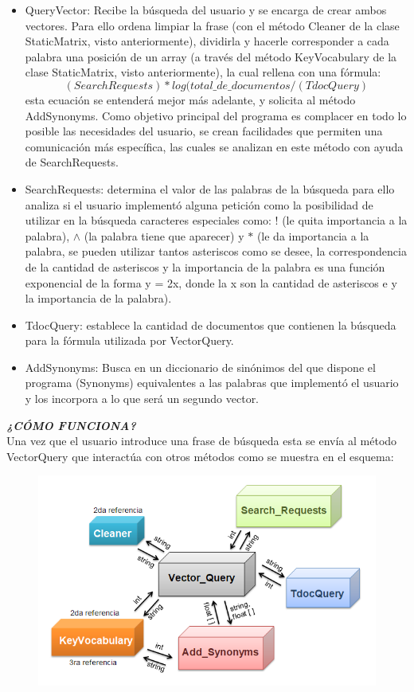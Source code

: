 \documentclass[12pt, letterpaper]{article}
\begin{document}
\begin{itemize}
    \item  QueryVector: Recibe la búsqueda del usuario y se encarga de crear ambos vectores. Para ello ordena limpiar la frase (con el método Cleaner de la clase StaticMatrix, visto anteriormente),  dividirla y hacerle corresponder a cada palabra una posición de un array (a través del método KeyVocabulary de la clase StaticMatrix, visto anteriormente), la cual rellena con una fórmula: \[(SearchRequests) * log(total\_de\_documentos / (TdocQuery)\] esta ecuación se entenderá mejor más adelante,  y solicita al método AddSynonyms. Como objetivo principal del programa es complacer en todo lo posible las necesidades del usuario, se crean facilidades que permiten una comunicación más específica, las cuales se analizan en este método con ayuda de SearchRequests. 
    \item SearchRequests: determina el valor de las palabras de la búsqueda  para ello analiza si el usuario implementó alguna petición como la posibilidad de utilizar en la búsqueda caracteres especiales como: ! (le quita importancia a la palabra),  $\land$ (la palabra tiene que aparecer) y  \(*\) (le da importancia a la palabra, se pueden utilizar tantos asteriscos como se desee, la correspondencia de la cantidad de asteriscos y la importancia de la palabra es una función exponencial de la forma y = 2x, donde la x son la cantidad de asteriscos  e y la importancia de la palabra). 
    \item TdocQuery: establece la cantidad de documentos que contienen la búsqueda para la fórmula utilizada por VectorQuery. 
    \item AddSynonyms: Busca en un diccionario de sinónimos del que dispone el programa (Synonyms) equivalentes a las palabras que implementó el usuario y los incorpora a lo que será un segundo vector. 
\end{itemize}
 
\textbf{\textit{¿CÓMO FUNCIONA? }} \\
Una vez que el usuario introduce una frase de búsqueda esta se envía al método VectorQuery que interactúa con otros métodos como se muestra en el esquema: 

\begin{figure}[h]
    \includegraphics[scale= 0.6]{dos.png}
\end{figure}
\end{document}
